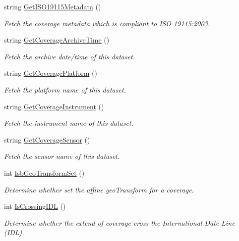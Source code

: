 \begin{DoxyCompactItemize}
string \hyperlink{classAbstractDataset_a6dab64e60c0cd4799408caf7afffb1cb}{GetISO19115Metadata} ()
\begin{DoxyCompactList}\small\item\em Fetch the coverage metadata which is compliant to ISO 19115:2003. \end{DoxyCompactList}\item 
string \hyperlink{classAbstractDataset_a25e49f67a2e5e84465d2b32a8b2457cb}{GetCoverageArchiveTime} ()
\begin{DoxyCompactList}\small\item\em Fetch the archive date/time of this dataset. \end{DoxyCompactList}\item 
string \hyperlink{classAbstractDataset_af98c41e04bc2f1f6ca57cf88b7dc34c4}{GetCoveragePlatform} ()
\begin{DoxyCompactList}\small\item\em Fetch the platform name of this dataset. \end{DoxyCompactList}\item 
string \hyperlink{classAbstractDataset_a258a7f882e62f899fe1ceb75fa8849f9}{GetCoverageInstrument} ()
\begin{DoxyCompactList}\small\item\em Fetch the instrument name of this dataset. \end{DoxyCompactList}\item 
string \hyperlink{classAbstractDataset_a9a60a3d1b5b094c58bbc927a58f22e6d}{GetCoverageSensor} ()
\begin{DoxyCompactList}\small\item\em Fetch the sensor name of this dataset. \end{DoxyCompactList}\item 
int \hyperlink{classAbstractDataset_a206bf47490d90bd0698fe2c491106c84}{IsbGeoTransformSet} ()
\begin{DoxyCompactList}\small\item\em Determine whether set the affine geoTransform for a coverage. \end{DoxyCompactList}\item 
int \hyperlink{classAbstractDataset_a3597ba14546a8fd5b0ea0bad7f9583e0}{IsCrossingIDL} ()
\begin{DoxyCompactList}\small\item\em Determine whether the extend of coverage cross the International Date Line (IDL). \end{DoxyCompactList}\item 

\end{DoxyCompactItemize}
